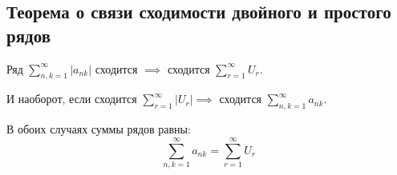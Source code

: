 \subsection{Теорема о связи сходимости двойного и простого рядов}

\begin{theorem}
    Ряд $ \sum_{n,k = 1}^{\infty} |a_{nk}| $ сходится $ \implies $ сходится $ \sum_{r=1}^{\infty}U_r $.

    И наоборот, если сходится $ \sum_{r=1}^{\infty}|U_r| \implies $ сходится $ \sum_{n,k = 1}^{\infty} a_{nk} $.

    В обоих случаях суммы рядов равны:
    \[
        \sum_{n,k=1}^{\infty}a_{nk} = \sum_{r=1}^{\infty}U_r
    \]
\end{theorem}